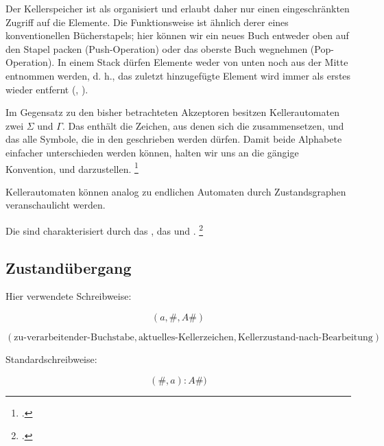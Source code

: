\documentclass{bschlangaul-theorie}
\begin{document}
Der Kellerspeicher ist als  organisiert und
erlaubt daher nur einen eingeschränkten Zugriff auf die Elemente. Die
Funktionsweise ist ähnlich derer eines konventionellen Bücherstapels;
hier können wir ein neues Buch entweder oben auf den Stapel packen
(Push-Operation) oder das oberste Buch wegnehmen (Pop-Operation). In
einem Stack dürfen Elemente weder von unten noch aus der Mitte entnommen
werden, d. h., das zuletzt hinzugefügte Element wird immer als erstes
wieder entfernt (, ).

Im Gegensatz zu den bisher betrachteten Akzeptoren besitzen
Kellerautomaten zwei  $\Sigma$ und
$\Gamma$. Das  enthält die Zeichen, aus
denen sich die  zusammensetzen, und das
 alle Symbole, die in den
 geschrieben werden dürfen. Damit beide Alphabete
einfacher unterschieden werden können, halten wir uns an die gängige
Konvention,  und
 darzustellen.
\footcite[Seite 224]{hoffmann}

Kellerautomaten können analog zu endlichen Automaten durch
Zustandsgraphen veranschaulicht werden.

Die  sind charakterisiert durch das
, das  und
.
\footcite[Seite 23]{theo:fs:2}

\subsection{Zustandübergang}

Hier verwendete Schreibweise:

\begin{displaymath}
(a, \#, A\#)
\end{displaymath}

\begin{displaymath}
(
\text{zu-verarbeitender-Buchstabe},
\text{aktuelles-Kellerzeichen},
\text{Kellerzustand-nach-Bearbeitung}
)
\end{displaymath}

Standardschreibweise:

\begin{displaymath}
(\#, a): A\#)
\end{displaymath}
\end{document}
